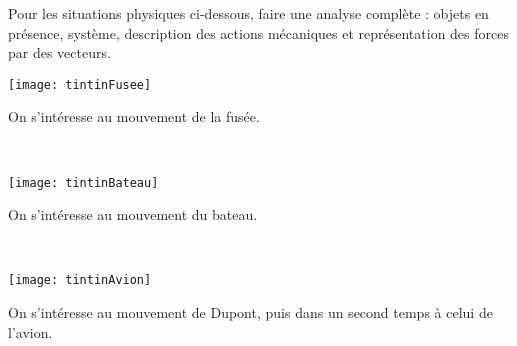 \begin{activite}


Pour les situations physiques ci-dessous, faire une analyse complète : objets en présence, système, description des actions mécaniques et représentation des forces par des vecteurs.

\vspace{1em}

\begin{minipage}[c]{.48\linewidth}
\centering%
\texttt{[image: tintinFusee]}
\end{minipage}\hfill%
\begin{minipage}[c]{.48\linewidth}
On s'intéresse au mouvement de la fusée.
\end{minipage}\\[1em]



\begin{minipage}[c]{.48\linewidth}
\centering%
\texttt{[image: tintinBateau]}
\end{minipage}\hfill%
\begin{minipage}[c]{.48\linewidth}
On s'intéresse au mouvement du bateau.
\end{minipage}\\[1em]




\begin{minipage}[c]{.48\linewidth}
\centering%
\texttt{[image: tintinAvion]}
\end{minipage}\hfill%
\begin{minipage}[c]{.48\linewidth}
On s'intéresse au mouvement de Dupont, puis dans un second temps à celui de l'avion.
\end{minipage}


\end{activite}



